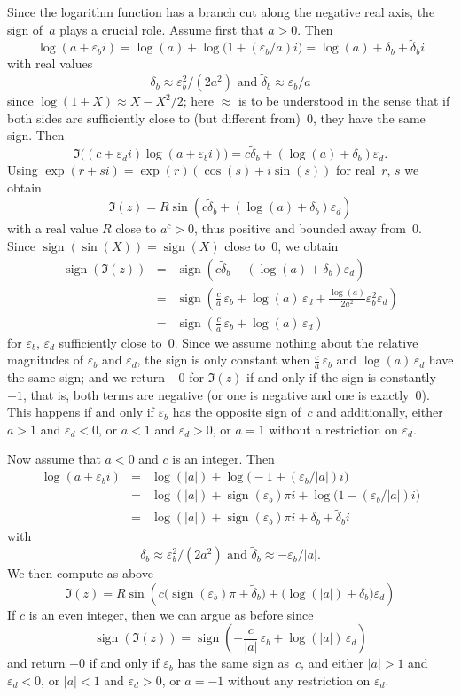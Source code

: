 \documentclass [11pt]{article}
\renewcommand {\epsilon}{\varepsilon}
\newcommand {\sign}{\operatorname{sign}}
\begin{document}
Since the logarithm function has a branch cut along the negative real
axis, the sign of~$a$ plays a crucial role. Assume first that $a > 0$.
Then
\[
\log (a + \epsilon_b i)
= \log (a) + \log \big( 1 + (\epsilon_b/a) i \big)
= \log (a) + \delta_b + \tilde \delta_b i
\]
with real values
\[
\delta_b \approx \epsilon_b^2 / (2 a^2)
\text { and }
\tilde\delta_b \approx \epsilon_b / a
\]
since
$\log (1 + X) \approx X - X^2/2$;
here $\approx$ is to be understood in the sense that if both sides are
sufficiently close to (but different from)~$0$, they have the same sign.
Then
\[
\Im \big( (c + \epsilon_d i) \log (a + \epsilon_b i) \big)
=
c \tilde \delta_b + (\log (a) + \delta_b) \epsilon_d.
\]
Using $\exp (r + s i) = \exp (r) (\cos (s) + i \sin (s))$
for real~$r$, $s$ we obtain
\[
\Im (z)
= R
\sin \left( c \tilde \delta_b + (\log (a) + \delta_b) \epsilon_d \right)
\]
with a real value $R$ close to $a^c > 0$, thus positive and bounded
away from~$0$.
Since $\sign (\sin (X)) = \sign (X)$ close to~$0$,
we obtain
\begin {eqnarray*}
\sign (\Im (z))
& = & \sign \left( c \tilde \delta_b + (\log (a) + \delta_b) \epsilon_d \right) \\
& = & \sign \left( \frac {c}{a} \, \epsilon_b + \log (a) \, \epsilon_d
+ \frac {\log (a)}{2 a^2} \epsilon_b^2 \epsilon_d \right) \\
& = & \sign \left( \frac {c}{a} \, \epsilon_b + \log (a) \, \epsilon_d \right)
\end {eqnarray*}
for $\epsilon_b$, $\epsilon_d$ sufficiently close to~$0$.
Since we assume nothing about the relative magnitudes of $\epsilon_b$ and
$\epsilon_d$, the sign is only constant when
$\frac {c}{a} \, \epsilon_b$ and $\log (a) \, \epsilon_d$ have the same sign;
and we return $-0$ for $\Im (z)$ if and only if the sign is
constantly~$-1$, that is, both terms are negative
(or one is negative and one is exactly~$0$).
This happens if and only if $\epsilon_b$ has the opposite sign of~$c$
and additionally,
either $a > 1$ and $\epsilon_d < 0$,
or     $a < 1$ and $\epsilon_d > 0$,
or     $a = 1$ without a restriction on $\epsilon_d$.

Now assume that $a < 0$ and $c$ is an integer. Then
\begin {eqnarray*}
\log (a + \epsilon_b i)
& = & \log (|a|) + \log \big( -1 + (\epsilon_b/|a|) i \big) \\
& = & \log (|a|) + \sign (\epsilon_b) \pi i
  + \log \big( 1 - (\epsilon_b/|a|) i \big) \\
& = & \log (|a|) + \sign (\epsilon_b) \pi i
+ \delta_b + \tilde \delta_b i
\end {eqnarray*}
with
\[
\delta_b \approx \epsilon_b^2 / (2 a^2)
\text { and }
\tilde\delta_b \approx - \epsilon_b / |a|.
\]
We then compute as above
\[
\Im (z)
= R
\sin \left( c \big( \sign (\epsilon_b) \pi + \tilde \delta_b \big)
+ \big( \log (|a|) + \delta_b \big) \epsilon_d \right)
\]
If $c$ is an even integer, then we can argue as before since
\[
\sign (\Im (z))
= \sign \left( - \frac {c}{|a|} \, \epsilon_b + \log (|a|) \, \epsilon_d \right)
\]
and return $-0$ if and only if
$\epsilon_b$ has the same sign as~$c$, and
either $|a| > 1$ and $\epsilon_d < 0$,
or     $|a| < 1$ and $\epsilon_d > 0$,
or     $a = -1$ without any restriction on $\epsilon_d$.
\end{document}
